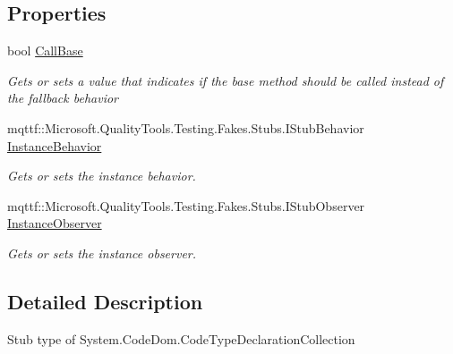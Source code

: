 \subsection*{Properties}
\begin{DoxyCompactItemize}
\item 
bool \hyperlink{class_system_1_1_code_dom_1_1_fakes_1_1_stub_code_type_declaration_collection_a3ebc5b8b64c00c2f1dbede45cafec3d6}{Call\-Base}
\begin{DoxyCompactList}\small\item\em Gets or sets a value that indicates if the base method should be called instead of the fallback behavior\end{DoxyCompactList}\item 
mqttf\-::\-Microsoft.\-Quality\-Tools.\-Testing.\-Fakes.\-Stubs.\-I\-Stub\-Behavior \hyperlink{class_system_1_1_code_dom_1_1_fakes_1_1_stub_code_type_declaration_collection_a8e92886ff3246c9daa73f88bf251daee}{Instance\-Behavior}
\begin{DoxyCompactList}\small\item\em Gets or sets the instance behavior.\end{DoxyCompactList}\item 
mqttf\-::\-Microsoft.\-Quality\-Tools.\-Testing.\-Fakes.\-Stubs.\-I\-Stub\-Observer \hyperlink{class_system_1_1_code_dom_1_1_fakes_1_1_stub_code_type_declaration_collection_ab515155ee4593454f1412e88131e82bf}{Instance\-Observer}
\begin{DoxyCompactList}\small\item\em Gets or sets the instance observer.\end{DoxyCompactList}\end{DoxyCompactItemize}


\subsection{Detailed Description}
Stub type of System.\-Code\-Dom.\-Code\-Type\-Declaration\-Collection



